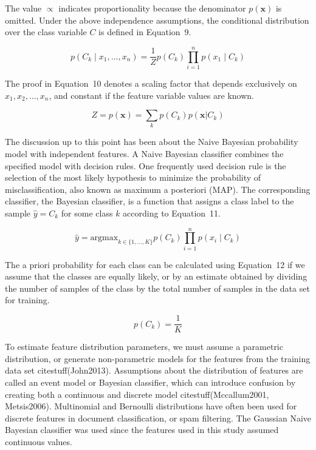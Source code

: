 \documentclass[preprint,12pt]{elsarticle}
\begin{document}
The value $\propto$ indicates proportionality because the denominator $p({\mathbf{x}})$ is omitted. Under the above independence assumptions, the conditional distribution over the class variable $C$ is defined in Equation~9.

\begin{equation}
	p(C_{k}\mid x_{1},\ldots,x_{n}) = \frac{1}{Z} p(C_{k}) \prod_{i=1}^{n} p(x_{1}\mid C_{k})
	\label{eqn:9}
\end{equation}

The proof in Equation~10 denotes a scaling factor that depends exclusively on $x_{1}, x_{2}, \ldots, x_{n}$, and constant if the feature variable values are known.

\begin{equation}
	Z = p(\mathbf{x}) = \sum_{k} p(C_{k}) p(\mathbf{x}|C_{k})
	\label{eqn:10}
\end{equation}

The discussion up to this point has been about the Naive Bayesian probability model with independent features. A Naive Bayesian classifier combines the specified model with decision rules. One frequently used decision rule is the selection of the most likely hypothesis to minimize the probability of misclassification, also known as maximum a posteriori (MAP). The corresponding classifier, the Bayesian classifier, is a function that assigns a class label to the sample $\hat{y} = C_{k}$ for some class $k$ according to Equation~11.

\begin{equation}
	\hat{y} = \mathrm{argmax}_{k\in \{1, \ldots, K\}} p(C_{k}) \prod_{i=1}^{n} p(x_{i}\mid C_{k})
	\label{eqn:11}
\end{equation}

The a priori probability for each class can be calculated using Equation~12 if we assume that the classes are equally likely, or by an estimate obtained by dividing the number of samples of the class by the total number of samples in the data set for training.

\begin{equation}
	p(C_{k}) = \frac{1}{K}
	\label{eqn:12}
\end{equation}

To estimate feature distribution parameters, we must assume a parametric distribution, or generate non-parametric models for the features from the training data set citestuff(John2013). Assumptions about the distribution of features are called an event model or Bayesian classifier, which can introduce confusion by creating both a continuous and discrete model citestuff(Mccallum2001, Metsis2006). Multinomial and Bernoulli distributions have often been used for discrete features in document classification, or spam filtering. The Gaussian Naive Bayesian classifier was used since the features used in this study assumed continuous values.
\end{document}
